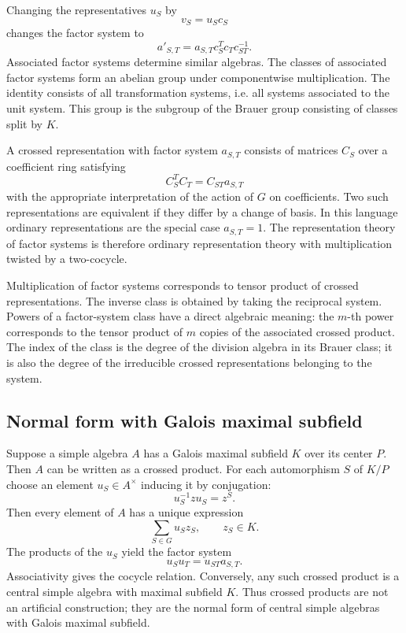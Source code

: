 \documentclass[11pt]{article}
\begin{document}
Changing the representatives \(u_S\) by
\[
  v_S=u_Sc_S
\]
changes the factor system to
\[
  a'_{S,T}=a_{S,T}c_S^Tc_Tc_{ST}^{-1}.
\]
Associated factor systems determine similar algebras. The classes of associated factor systems form an abelian group under componentwise multiplication. The identity consists of all transformation systems, i.e. all systems associated to the unit system. This group is the subgroup of the Brauer group consisting of classes split by \(K\).

A crossed representation with factor system \(a_{S,T}\) consists of matrices \(C_S\) over a coefficient ring satisfying
\[
  C_S^T C_T=C_{ST}a_{S,T}
\]
with the appropriate interpretation of the action of \(G\) on coefficients. Two such representations are equivalent if they differ by a change of basis. In this language ordinary representations are the special case \(a_{S,T}=1\). The representation theory of factor systems is therefore ordinary representation theory with multiplication twisted by a two-cocycle.

Multiplication of factor systems corresponds to tensor product of crossed representations. The inverse class is obtained by taking the reciprocal system. Powers of a factor-system class have a direct algebraic meaning: the \(m\)-th power corresponds to the tensor product of \(m\) copies of the associated crossed product. The index of the class is the degree of the division algebra in its Brauer class; it is also the degree of the irreducible crossed representations belonging to the system.

\subsection{Normal form with Galois maximal subfield}

Suppose a simple algebra \(A\) has a Galois maximal subfield \(K\) over its center \(P\). Then \(A\) can be written as a crossed product. For each automorphism \(S\) of \(K/P\) choose an element \(u_S\in A^{\times}\) inducing it by conjugation:
\[
  u_S^{-1}zu_S=z^S.
\]
Then every element of \(A\) has a unique expression
\[
  \sum_{S
\in G} u_S z_S,
  \qquad z_S\in K.
\]
The products of the \(u_S\) yield the factor system
\[
  u_Su_T=u_{ST}a_{S,T}.
\]
Associativity gives the cocycle relation. Conversely, any such crossed product is a central simple algebra with maximal subfield \(K\). Thus crossed products are not an artificial construction; they are the normal form of central simple algebras with Galois maximal subfield.
\end{document}
